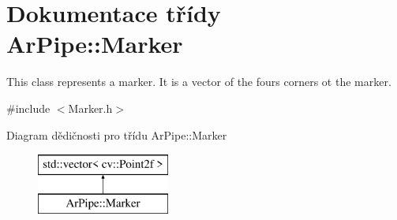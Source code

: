 \hypertarget{class_ar_pipe_1_1_marker}{\section{Dokumentace třídy Ar\-Pipe\-:\-:Marker}
\label{d4/dc2/class_ar_pipe_1_1_marker}
}


This class represents a marker. It is a vector of the fours corners ot the marker.  




{\ttfamily \#include $<$Marker.\-h$>$}

Diagram dědičnosti pro třídu Ar\-Pipe\-:\-:Marker\begin{figure}[H]
\begin{center}
\leavevmode
\includegraphics[height=2.000000cm]{d4/dc2/class_ar_pipe_1_1_marker}
\end{center}
\end{figure}
